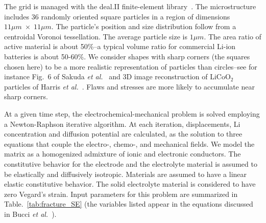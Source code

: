 \documentclass[final,5p,sort&compress]{elsarticle}
\begin{document}
The grid is managed with the deal.II finite-element library~\cite{BangerthHartmannKanschat2007,dealII82}.
The microstructure includes 36 randomly oriented square particles in a region of dimensions $ 11 \mu m \; \times \; 11 \mu m$. 
The particle's position and size distribution follow from a centroidal Voronoi tessellation.
The average particle size is $ 1 \mu m $. The area ratio of active material is about 50\%--a typical volume ratio for commercial Li-ion batteries is about 50-60\%.
We consider shapes with sharp corners (the squares chosen here) to be a more realistic representation of particles than circles--see for instance Fig.~6 of Sakuda \emph{et al.}~\cite{Sakuda2013}
and 3D image reconstruction of LiCoO$_2$ particles of Harris \emph{et al.}~\cite{Harris2013}.
Flaws and stresses are more likely to accumulate near sharp corners.


At a given time step, the electrochemical-mechanical problem is solved employing a Newton-Raphson iterative algorithm. At each iteration, 
displacements, Li concentration and diffusion potential
are calculated, as the solution to 
three equations that couple the electro-, chemo-, and mechanical fields.
We model the matrix as a homogenized admixture of ionic and electronic conductors. 
The constitutive behavior for the electrode and the electrolyte material is assumed to be elastically and diffusively isotropic. 
Materials are assumed to have a linear elastic constitutive behavior.
The solid electrolyte material is considered to have zero Vegard's strain. 
%
Input parameters for this problem  are summarized in Table.~\ref{tab:fracture_SE} (the variables listed appear in the equations discussed in Bucci \emph{et al.}~\cite{bucciActaMat2015}).
\end{document}
